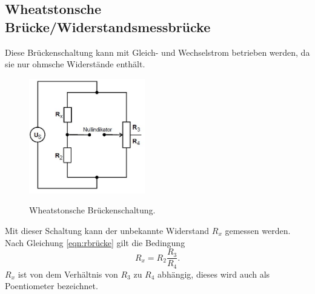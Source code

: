 \subsection{Wheatstonsche Brücke/Widerstandsmessbrücke}
\noindent Diese Brückenschaltung kann mit Gleich- und Wechselstrom betrieben werden,
da sie nur ohmsche Widerstände enthält.
\begin{figure}[H]
  \centering
  \includegraphics[height=5cm]{widerstand.JPG}
  \caption{Wheatstonsche Brückenschaltung.}
  \label{fig:widerstand}
  \cite{skript}
\end{figure}

\noindent Mit dieser Schaltung kann der unbekannte Widerstand $R_{x}$ gemessen werden.
Nach Gleichung \ref{eqn:rbrücke} gilt die Bedingung
\begin{equation}
  R_{x}= R_{2}\frac{R_{3}}{R_{4}}.
  \label{eqn:rx}
\end{equation}
$R_{x}$ ist von dem Verhältnis von $R_{3}$ zu $R_{4}$ abhängig, dieses wird auch
als Poentiometer bezeichnet.
